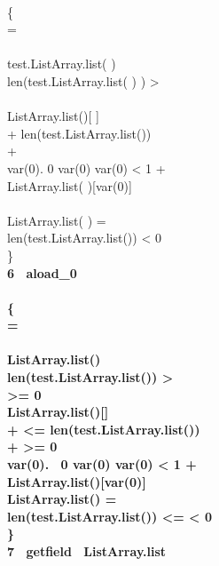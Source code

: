 \\
  \{ \\
  = \Mynull \Rightarrow \false  \wedge\\ 
  \neq \Mynull \Rightarrow \\
 \Myspace 	test.ListArray.list( ) \neq \Mynull \wedge \\ 
 \Myspace 	len(test.ListArray.list( ) ) >  \wedge \\ 
 \Myspace 	{}  \wedge \\   
 \Myspace 	{} \neq ListArray.list()[ ]  \Rightarrow  \\ 
 \Myspace {} +   \leq len(test.ListArray.list())  \wedge \\
 \Myspace {} +    \wedge \\ 
 \Myspace \Myspace   \forall  var(0).   0 \leq var(0) \wedge var(0) < 1 +    \Rightarrow  \\ 		             
 \Myspace \Myspace \Myspace  ListArray.list( )[var(0)] \neq {}        \\
		\wedge \\
ListArray.list( ) = \Mynull  \Rightarrow  \false   \wedge \\
  len(test.ListArray.list()) \le {} \vee {} < 0 \Rightarrow  \false  \\
\}  \\
\bf{ 6 \ aload\_0 }\\
\\


  \{ \\
\stack{\counter} =  \Mynull \Rightarrow \false  \wedge \\ 
 \stack{ \counter} \neq \Mynull \Rightarrow \\
 \Myspace 	ListArray.list(\stack{\counter}) \neq \Mynull  \wedge \\ 
 \Myspace        len(test.ListArray.list(\stack{\counter})) >  \wedge  \\
 \Myspace 	{} >= 0   \wedge \\
 \Myspace 	{} \neq ListArray.list(\stack{\counter})[]   \Rightarrow \\
 \Myspace {} +  <= len(test.ListArray.list()) \wedge \\
 \Myspace {} +  >= 0  \wedge \\
 \Myspace \Myspace 	\forall  var(0). \  0 \leq var(0) \wedge var(0) < 1 +   \Rightarrow \\
 \Myspace \Myspace \Myspace ListArray.list()[var(0)] \neq {}   \wedge \\
ListArray.list(\stack{\counter}) = \Mynull \Rightarrow \false   \wedge \\
  len(test.ListArray.list(\stack{\counter})) <=  \vee {} < 0  \Rightarrow \false \\
\}  \\
\bf{ 7 \ getfield \ ListArray.list} \\

